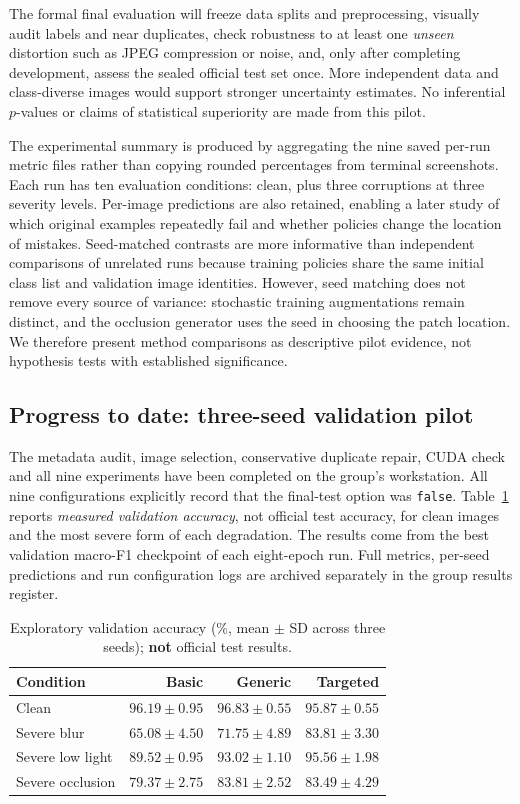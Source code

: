 \documentclass[sigconf,nonacm]{acmart}
\begin{document}
The formal final evaluation will freeze data splits and preprocessing, visually audit labels and near duplicates, check robustness to at least one \emph{unseen} distortion such as JPEG compression or noise, and, only after completing development, assess the sealed official test set once. More independent data and class-diverse images would support stronger uncertainty estimates. No inferential $p$-values or claims of statistical superiority are made from this pilot.


The experimental summary is produced by aggregating the nine saved per-run metric files rather than copying rounded percentages from terminal screenshots. Each run has ten evaluation conditions: clean, plus three corruptions at three severity levels. Per-image predictions are also retained, enabling a later study of which original examples repeatedly fail and whether policies change the location of mistakes. Seed-matched contrasts are more informative than independent comparisons of unrelated runs because training policies share the same initial class list and validation image identities. However, seed matching does not remove every source of variance: stochastic training augmentations remain distinct, and the occlusion generator uses the seed in choosing the patch location. We therefore present method comparisons as descriptive pilot evidence, not hypothesis tests with established significance.

\subsection{Progress to date: three-seed validation pilot}
The metadata audit, image selection, conservative duplicate repair, CUDA check and all nine experiments have been completed on the group's workstation. All nine configurations explicitly record that the final-test option was \texttt{false}. Table~\ref{tab:results} reports \emph{measured validation accuracy}, not official test accuracy, for clean images and the most severe form of each degradation. The results come from the best validation macro-F1 checkpoint of each eight-epoch run. Full metrics, per-seed predictions and run configuration logs are archived separately in the group results register.

\begin{table}[t]
\caption{Exploratory validation accuracy (\%, mean $\pm$ SD across three seeds); \textbf{not} official test results.}
\label{tab:results}
\small
\begin{tabular}{lrrr}
\toprule
Condition & Basic & Generic & Targeted\\
\midrule
Clean & $96.19\pm0.95$ & $\mathbf{96.83\pm0.55}$ & $95.87\pm0.55$\\
Severe blur & $65.08\pm4.50$ & $71.75\pm4.89$ & $\mathbf{83.81\pm3.30}$\\
Severe low light & $89.52\pm0.95$ & $93.02\pm1.10$ & $\mathbf{95.56\pm1.98}$\\
Severe occlusion & $79.37\pm2.75$ & $\mathbf{83.81\pm2.52}$ & $83.49\pm4.29$\\
\bottomrule
\end{tabular}
\end{table}
\end{document}
